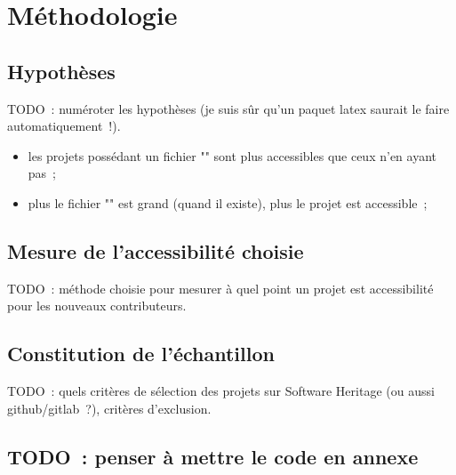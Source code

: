 \chapter{Méthodologie}

\section{Hypothèses}

TODO : numéroter les hypothèses (je suis sûr qu'un paquet latex saurait le faire automatiquement !).

\begin{itemize}
    \item les projets possédant un fichier "" sont plus accessibles que ceux n'en ayant pas ;
    \item plus le fichier "" est grand (quand il existe), plus le projet est accessible ;
\end{itemize}

\section{Mesure de l'accessibilité choisie}

TODO : méthode choisie pour mesurer à quel point un projet est accessibilité pour les nouveaux contributeurs.

\section{Constitution de l'échantillon}

TODO : quels critères de sélection des projets sur Software Heritage (ou aussi github/gitlab ?), critères
d'exclusion.

\section*{TODO : penser à mettre le code en annexe}
